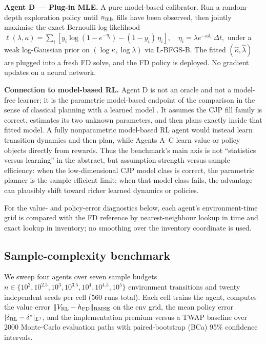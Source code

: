 \documentclass[]{interact}
\theoremstyle{plain}
\theoremstyle{definition}
\theoremstyle{remark}
\newcommand{\1}[1]{\mathbf{1}_{\{#1\}}}
\begin{document}
\smallskip\noindent\textbf{Agent D --- Plug-in MLE.} A pure model-based calibrator. Run a random-depth exploration policy until $n_{\rm fills}$ fills have been observed, then jointly maximise the exact Bernoulli log-likelihood
$
\ell(\lambda, \kappa) = \sum_i [ y_i \log(1 - e^{-\eta_i}) - (1 - y_i)\,\eta_i ],
\quad \eta_i = \lambda e^{-\kappa \delta_i}\, \Delta t,
$
under a weak log-Gaussian prior on $(\log \kappa, \log \lambda)$ via L-BFGS-B. The fitted $(\hat\kappa, \hat\lambda)$ are plugged into a fresh FD solve, and the FD policy is deployed. No gradient updates on a neural network.

\smallskip\noindent\textbf{Connection to model-based RL.} Agent D is not an oracle and not a model-free learner; it is the parametric model-based endpoint of the comparison in the sense of classical planning with a learned model \citep{suttonbarto2018,bertsekas2019rl}. It assumes the CJP fill family is correct, estimates its two unknown parameters, and then plans exactly inside that fitted model. A fully nonparametric model-based RL agent would instead learn transition dynamics and then plan, while Agents A--C learn value or policy objects directly from rewards. Thus the benchmark's main axis is not ``statistics versus learning'' in the abstract, but assumption strength versus sample efficiency: when the low-dimensional CJP model class is correct, the parametric planner is the sample-efficient limit; when that model class fails, the advantage can plausibly shift toward richer learned dynamics or policies.

For the value- and policy-error diagnostics below, each agent's environment-time grid is compared with the FD reference by nearest-neighbour lookup in time and exact lookup in inventory; no smoothing over the inventory coordinate is used.

\subsection{Sample-complexity benchmark}\label{sec:sample-complexity}

We sweep four agents over seven sample budgets $n \in \{10^2, 10^{2.5}, 10^3, 10^{3.5}, 10^4, 10^{4.5}, 10^5\}$ environment transitions and twenty independent seeds per cell ($560$ runs total). Each cell trains the agent, computes the value error $\|V_{\rm RL} - h_{\rm FD}\|_{\rm RMSE}$ on the env grid, the mean policy error $|\delta_{\rm RL} - \delta^*|_{L^1}$, and the implementation premium versus a TWAP baseline over $2000$ Monte-Carlo evaluation paths with paired-bootstrap (BCa) 95\% confidence intervals.
\end{document}
